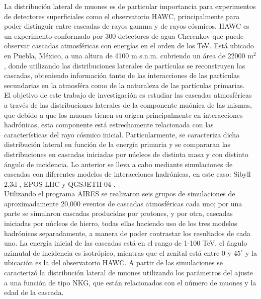 La distribuci\'on lateral de muones es de particular importancia para experimentos de detectores superficiales como el observatorio HAWC, principalmente para poder distinguir entre cascadas de rayos gamma y de rayos c\'osmicos. HAWC es un experimento conformado por 300 detectores de agua Cherenkov que puede observar cascadas atmosf\'ericas con energ\'ias en el orden de los TeV. Est\'a ubicado en Puebla, M\'exico, a una altura de 4100 m s.n.m. cubriendo un \'area de 22000 m$^2$, donde utilizando las distribuciones laterales de part\'iculas se reconstruyen las cascadas, obteniendo informaci\'on tanto de las interacciones de las part\'iculas secundarias en la atmosf\'era como de la naturaleza de las part\'iculas primarias.\\

El objetivo de este trabajo de investigaci\'on es estudiar las cascadas atmosf\'ericas a trav\'es de las distribuciones laterales de la componente mu\'onica de las mismas, que debido a que los muones tienen su origen principalmente en interacciones hadr\'onicas, esta componente est\'a estrechamente relacionada con las caracter\'isticas del rayo c\'osmico inicial. Particularmente, se caracteriza dicha distribuci\'on lateral en funci\'on de la energ\'ia primaria y se compararan las distribuciones en cascadas iniciadas por n\'ucleos de distinta masa y con distinto \'angulo de incidencia. Lo anterior se lleva a cabo mediante simulaciones de cascadas con diferentes modelos de interacciones hadrónicas, en este caso: Sibyll 2.3d \DIFaddbegin {}\DIFaddend , EPOS-LHC \DIFaddbegin {}\DIFaddend y QGSJETII-04 \DIFaddbegin {}\DIFaddend .\\

Utilizando el programa AIRES \DIFaddbegin {}\DIFaddend se realizaron seis grupos de simulaciones de aproximadamente 20,000 eventos de cascadas atmosf\'ericas cada uno; por una parte se simularon cascadas producidas por protones, y por otra, cascadas iniciadas por n\'ucleos de hierro, todas ellas haciendo uso de los tres modelos hadr\'onicos separadamente, a manera de poder contrastar los resultados de cada uno. La energ\'ia inicial de las cascadas est\'a en el rango de 1-100 TeV, el \'angulo azimutal de incidencia es isotr\'opico, mientras que el zenital est\'a entre 0 y $45^{\circ}$ y la ubicaci\'on es la del observatorio HAWC. A partir de las simulaciones se caracteriz\'o la distribuci\'on lateral de muones utilizando los par\'ametros del ajuste a una funci\'on de tipo NKG, que est\'an relacionados con el n\'umero de muones y la edad de la cascada.\\

